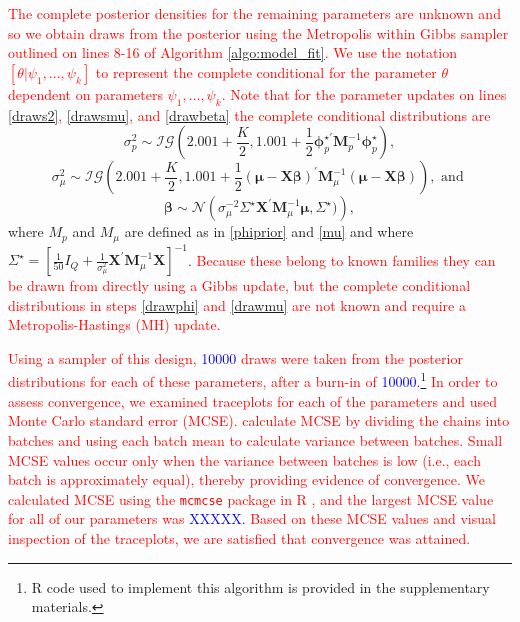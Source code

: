\documentclass[final]{statsoc}
\begin{document}
 \textcolor{red}{The complete posterior densities for the remaining parameters are unknown and so we obtain draws from the posterior using the Metropolis within Gibbs sampler outlined on lines 8-16 of Algorithm \ref{algo:model_fit}. We use the notation $\left[\theta | \psi_1, \dots, \psi_k \right]$ to represent the complete conditional for the parameter $\theta$ dependent on parameters $\psi_1, \dots, \psi_k$. Note that for the parameter updates on lines \ref{draws2}, \ref{drawsmu}, and \ref{drawbeta} the complete conditional distributions are}
\begin{equation}
\sigma^2_p \sim \mathcal{IG}\left(2.001 + \frac{K}{2}, 1.001 + \frac{1}{2}\boldsymbol\phi_p^{\star\prime}\mathbf{M}_p^{-1}\boldsymbol\phi_p^\star\right),
\end{equation}
\begin{equation}
\sigma^2_\mu \sim \mathcal{IG}\left(2.001 + \frac{K}{2}, 1.001 + \frac{1}{2}(\boldsymbol\mu - \mathbf{X}\boldsymbol\beta)^\prime\mathbf{M}^{-1}_\mu(\boldsymbol\mu - \mathbf{X}\boldsymbol\beta)\right), \text{ and }
\end{equation}
\begin{equation}
\boldsymbol{\beta} \sim \mathcal{N}\left(\sigma_\mu^{-2}\Sigma^{\star}\mathbf{X}^\prime\mathbf{M}_\mu^{-1}\boldsymbol\mu, \Sigma^\star)\right), 
\end{equation}
where $M_p$ and $M_\mu$ are defined as in \eqref{phiprior} and \eqref{mu} and where $\Sigma^\star = \left[\frac{1}{50}I_Q + \frac{1}{\sigma^2_\mu}\mathbf{X}^\prime \mathbf{M}_\mu^{-1}\mathbf{X}\right]^{-1}$. 
\textcolor{red}{
Because these belong to known families they can be drawn from directly using a Gibbs update, but the complete conditional distributions in steps \ref{drawphi} and \ref{drawmu} are not known and require a Metropolis-Hastings (MH) update.}

\textcolor{red}{Using a sampler of this design, \textcolor{blue}{10000} draws were taken from the posterior distributions for each of these parameters, after a burn-in of \textcolor{blue}{10000.}\footnote{R code used to implement this algorithm is provided in the supplementary materials.} In order to assess convergence, we examined traceplots for each of the parameters and used Monte Carlo standard error (MCSE). \cite{Jones2006} calculate MCSE by dividing the chains into batches and using each batch mean to calculate variance between batches. Small MCSE values occur only when the variance between batches is low (i.e., each batch is approximately equal), thereby providing evidence of convergence. We calculated MCSE using the \texttt{mcmcse} package in R \citep{Flegal2015}, and the largest MCSE value for all of our parameters was \textcolor{blue}{XXXXX.} Based on these MCSE values and visual inspection of the traceplots, we are satisfied that convergence was attained.}
\end{document}
